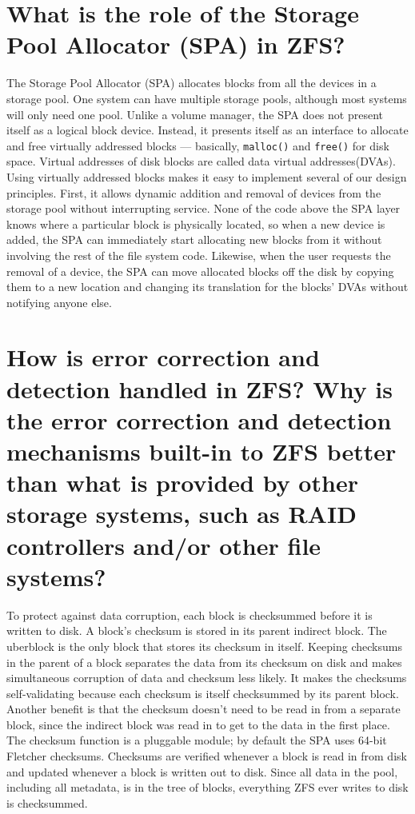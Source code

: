 \documentclass{article}
\begin{document}
\section{What is the role of the Storage Pool Allocator (SPA) in ZFS?}
The Storage Pool Allocator (SPA) allocates blocks from all the devices in a storage pool. One system can have multiple storage pools, although most systems will only need one pool. Unlike a volume manager, the SPA does not present itself as a logical block device. Instead, it presents itself as an interface to allocate and free virtually addressed blocks — basically, \texttt{malloc()} and \texttt{free()} for disk space. Virtual addresses of disk blocks are called data virtual addresses(DVAs). Using virtually addressed blocks makes it easy to implement several of our design principles. First, it allows dynamic addition and removal of devices from the storage pool without interrupting service.  None of the code above the SPA layer knows where a particular block is physically located, so when a new device is added, the SPA can immediately start allocating new blocks from it without involving the rest of the file system code.  Likewise, when the user requests the removal of a device, the SPA can move allocated blocks off the disk by copying them to a new location and changing its translation for the blocks’ DVAs without notifying anyone else.

\section{How is error correction and detection handled in ZFS? Why is the error correction and detection mechanisms  built-in  to  ZFS  better  than  what  is  provided by other storage systems, such as RAID controllers and/or other file systems?}
To protect against data corruption, each block is checksummed before it is written to disk. 
A block’s checksum is stored in its parent indirect block. 
The uberblock is the only block that stores its checksum in itself.  
Keeping checksums in the parent of a block separates the data from its checksum on disk and makes simultaneous corruption of data and checksum less likely.
It makes the checksums self-validating because each checksum is itself checksummed by its parent block.
Another benefit is that the checksum doesn’t need to be read in from a separate block,
since the indirect block was read in to get to the data in the first place.
The checksum function is a pluggable module; 
by default the SPA uses 64-bit Fletcher checksums.
Checksums are verified whenever a block is read in from disk and updated whenever a block is written out to disk. 
Since all data in the pool, including all metadata, is in the tree of blocks, 
everything ZFS ever writes to disk is checksummed.
\end{document}
